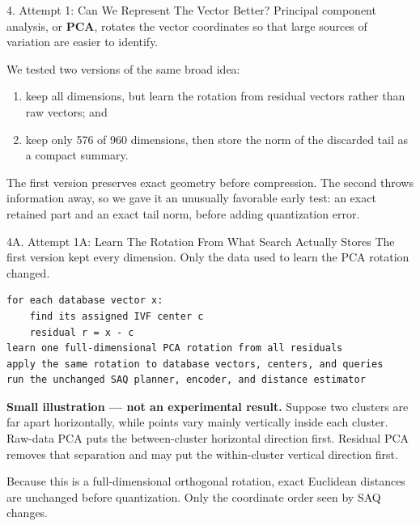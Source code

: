 \documentclass[
  ignorenonframetext,
  aspectratio=169,
]{beamer}
\providecommand{\tightlist}{%
  \setlength{\itemsep}{0pt}\setlength{\parskip}{0pt}}
\begin{document}
\begin{frame}{4. Attempt 1: Can We Represent The Vector Better?}
\protect{}\label{4-attempt-1-can-we-represent-the-vector-better}
Principal component analysis, or \textbf{PCA}, rotates the vector
coordinates so that large sources of variation are easier to identify.

We tested two versions of the same broad idea:

\begin{enumerate}
\tightlist
\item
  keep all dimensions, but learn the rotation from residual vectors
  rather than raw vectors; and
\item
  keep only 576 of 960 dimensions, then store the norm of the discarded
  tail as a compact summary.
\end{enumerate}

The first version preserves exact geometry before compression. The
second throws information away, so we gave it an unusually favorable
early test: an exact retained part and an exact tail norm, before adding
quantization error.
\end{frame}

\begin{frame}[fragile]{4A. Attempt 1A: Learn The Rotation From What Search Actually Stores}
\small
The first version kept every dimension. Only the data used to learn the
PCA rotation changed.

\begin{verbatim}
for each database vector x:
    find its assigned IVF center c
    residual r = x - c
learn one full-dimensional PCA rotation from all residuals
apply the same rotation to database vectors, centers, and queries
run the unchanged SAQ planner, encoder, and distance estimator
\end{verbatim}

\textbf{Small illustration --- not an experimental result.} Suppose two
clusters are far apart horizontally, while points vary mainly vertically
inside each cluster. Raw-data PCA puts the between-cluster horizontal
direction first. Residual PCA removes that separation and may put the
within-cluster vertical direction first.

Because this is a full-dimensional orthogonal rotation, exact Euclidean
distances are unchanged before quantization. Only the coordinate order seen
by SAQ changes.
\end{frame}
\end{document}
